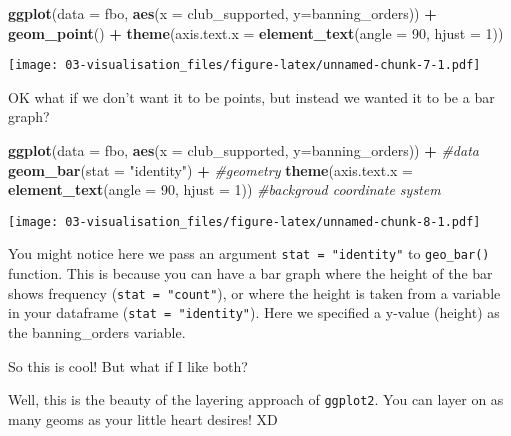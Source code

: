 \documentclass[
]{book}
\newenvironment{Shaded}{\begin{snugshade}}{\end{snugshade}}
\newcommand{\AttributeTok}[1]{\textcolor[rgb]{0.13,0.29,0.53}{#1}}
\newcommand{\CommentTok}[1]{\textcolor[rgb]{0.56,0.35,0.01}{\textit{#1}}}
\newcommand{\DecValTok}[1]{\textcolor[rgb]{0.00,0.00,0.81}{#1}}
\newcommand{\FunctionTok}[1]{\textcolor[rgb]{0.13,0.29,0.53}{\textbf{#1}}}
\newcommand{\NormalTok}[1]{#1}
\newcommand{\SpecialCharTok}[1]{\textcolor[rgb]{0.81,0.36,0.00}{\textbf{#1}}}
\newcommand{\StringTok}[1]{\textcolor[rgb]{0.31,0.60,0.02}{#1}}
\begin{document}
\begin{Shaded}
\begin{Highlighting}[]
\FunctionTok{ggplot}\NormalTok{(}\AttributeTok{data =}\NormalTok{ fbo, }\FunctionTok{aes}\NormalTok{(}\AttributeTok{x =}\NormalTok{ club\_supported, }\AttributeTok{y=}\NormalTok{banning\_orders)) }\SpecialCharTok{+} 
  \FunctionTok{geom\_point}\NormalTok{() }\SpecialCharTok{+} 
  \FunctionTok{theme}\NormalTok{(}\AttributeTok{axis.text.x =} \FunctionTok{element\_text}\NormalTok{(}\AttributeTok{angle =} \DecValTok{90}\NormalTok{, }\AttributeTok{hjust =} \DecValTok{1}\NormalTok{))                                   }
\end{Highlighting}
\end{Shaded}

\texttt{[image: 03-visualisation\_files/figure-latex/unnamed-chunk-7-1.pdf]}

OK what if we don't want it to be points, but instead we wanted it to be a bar graph?

\begin{Shaded}
\begin{Highlighting}[]
\FunctionTok{ggplot}\NormalTok{(}\AttributeTok{data =}\NormalTok{ fbo, }\FunctionTok{aes}\NormalTok{(}\AttributeTok{x =}\NormalTok{ club\_supported, }\AttributeTok{y=}\NormalTok{banning\_orders)) }\SpecialCharTok{+}   \CommentTok{\#data}
  \FunctionTok{geom\_bar}\NormalTok{(}\AttributeTok{stat =} \StringTok{"identity"}\NormalTok{) }\SpecialCharTok{+}                                   \CommentTok{\#geometry}
  \FunctionTok{theme}\NormalTok{(}\AttributeTok{axis.text.x =} \FunctionTok{element\_text}\NormalTok{(}\AttributeTok{angle =} \DecValTok{90}\NormalTok{, }\AttributeTok{hjust =} \DecValTok{1}\NormalTok{))        }\CommentTok{\#backgroud coordinate system}
\end{Highlighting}
\end{Shaded}

\texttt{[image: 03-visualisation\_files/figure-latex/unnamed-chunk-8-1.pdf]}

You might notice here we pass an argument \texttt{stat\ =\ "identity"} to \texttt{geo\_bar()} function. This is because you can have a bar graph where the height of the bar shows frequency (\texttt{stat\ =\ "count"}), or where the height is taken from a variable in your dataframe (\texttt{stat\ =\ "identity"}). Here we specified a y-value (height) as the banning\_orders variable.

So this is cool! But what if I like both?

Well, this is the beauty of the layering approach of \texttt{ggplot2}. You can layer on as many geoms as your little heart desires! XD
\end{document}
